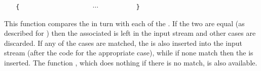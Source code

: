\documentclass[oneside]{book}
\begin{document}
\begin{function}{\tlVarCaseTF}
\begin{syntax}
 
~ ~ \verb"{"
~ ~ ~ ~  
~ ~ ~ ~  
~ ~ ~ ~ $\cdots$
~ ~ ~ ~  
~ ~ \verb"}"
~ ~ 
~ ~ 
\end{syntax}
This function compares the  in turn
with each of the . If the two
are equal (as described for )
then the associated  is left in the input
stream and other cases are discarded. If any of the
cases are matched, the  is also inserted into the
input stream (after the code for the appropriate case), while if none
match then the  is inserted. The function ,
which does nothing if there is no match, is also available.
\begin{demohigh}
\IgnoreSpacesOn
\tlSet {}
\tlSet {}
\tlSet {}
\tlSet {}
\tlVarCaseTF {}
\IgnoreSpacesOff
\end{demohigh}
\end{function}
\end{document}
